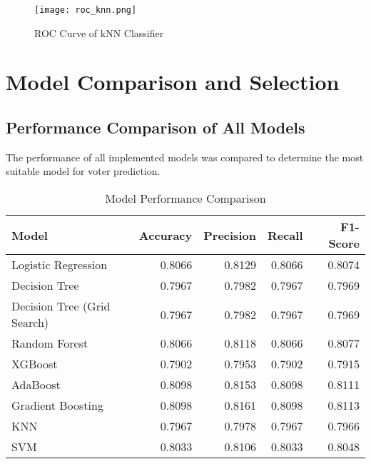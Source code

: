 \documentclass[12pt]{article}
\begin{document}
\begin{figure}[H]
    \centering
    \texttt{[image: roc\_knn.png]}
    \caption{ROC Curve of kNN Classifier}
    \label{fig:example}
\end{figure}


\section{Model Comparison and Selection}

\subsection{Performance Comparison of All Models}
The performance of all implemented models was compared to determine the most suitable model for voter prediction.

\begin{table}[h]
\centering
\caption{Model Performance Comparison}
\label{tab:model_comp}
\begin{tabular}{lrrrr}
\toprule
\textbf{Model} & \textbf{Accuracy} & \textbf{Precision} & \textbf{Recall} & \textbf{F1-Score} \\
\midrule
Logistic Regression & 0.8066 & 0.8129 & 0.8066 & 0.8074 \\
Decision Tree & 0.7967 & 0.7982 & 0.7967 & 0.7969 \\
Decision Tree (Grid Search) & 0.7967 & 0.7982 & 0.7967 & 0.7969 \\
Random Forest & 0.8066 & 0.8118 & 0.8066 & 0.8077 \\
XGBoost & 0.7902 & 0.7953 & 0.7902 & 0.7915 \\
AdaBoost & 0.8098 & 0.8153 & 0.8098 & 0.8111 \\
Gradient Boosting & 0.8098 & 0.8161 & 0.8098 & 0.8113 \\
KNN & 0.7967 & 0.7978 & 0.7967 & 0.7966 \\
SVM & 0.8033 & 0.8106 & 0.8033 & 0.8048 \\
\bottomrule
\end{tabular}
\end{table}
\end{document}
